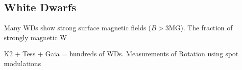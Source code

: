 {\color{red} \subsection{White Dwarfs}}
Many WDs show strong surface magnetic fields ($B>$3MG). The fraction of strongly magnetic W 

K2 + Tess + Gaia = hundreds of WDs. Measurements of Rotation using spot modulations